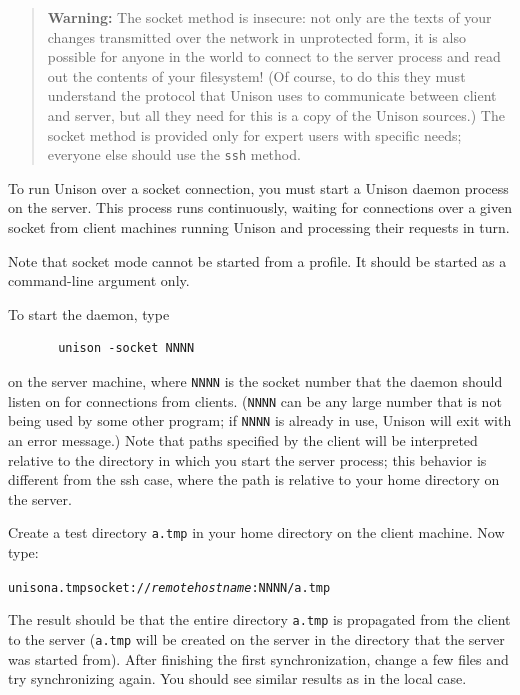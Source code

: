 \documentclass{article}
\newcommand{\NT}[1]{\textit{#1}}
\begin{document}

\begin{quote}
  {\bf\ifhevea\red\fi Warning:} The socket method is
  insecure: not only are the texts of your changes transmitted over
  the network in unprotected form, it is also possible for anyone in
  the world to connect to the server process and read out the contents
  of your filesystem!  (Of course, to do this they must understand the
  protocol that Unison uses to communicate between client and server,
  but all they need for this is a copy of the Unison sources.)  The socket
  method is provided only for expert users with specific needs; everyone
  else should use the \verb|ssh| method.
\end{quote}

To run Unison over a socket connection, you must start a Unison
daemon process on the server.  This process runs continuously,
waiting for connections over a given socket from client machines
running Unison and processing their requests in turn.

Note that socket mode cannot be started from a profile. It should be started as a command-line argument only.

To start the daemon, type
\begin{verbatim}
       unison -socket NNNN
\end{verbatim}
on the server machine, where {\tt NNNN} is the socket number that the
daemon should listen on for connections from clients.  ({\tt NNNN} can
be any large number that is not being used by some other program; if
\texttt{NNNN} is already in use, Unison will exit with an error
message.)  Note that paths specified by the client will be interpreted
relative to the directory in which you start the server process; this
behavior is different from the ssh case, where the path is relative to
your home directory on the server.

Create a test directory {\tt a.tmp} in your home directory on the
client machine.  Now type:
\begin{alltt}
       unison a.tmp socket://\NT{remotehostname}:NNNN/a.tmp
\end{alltt}
The result should be that the entire directory {\tt a.tmp} is
propagated from the client to the server (\texttt{a.tmp} will be
created on the server in the directory that the server was started
from).
%
After finishing the first synchronization, change a few files and try
synchronizing again.  You should see similar results as in the local
case.
\end{document}
